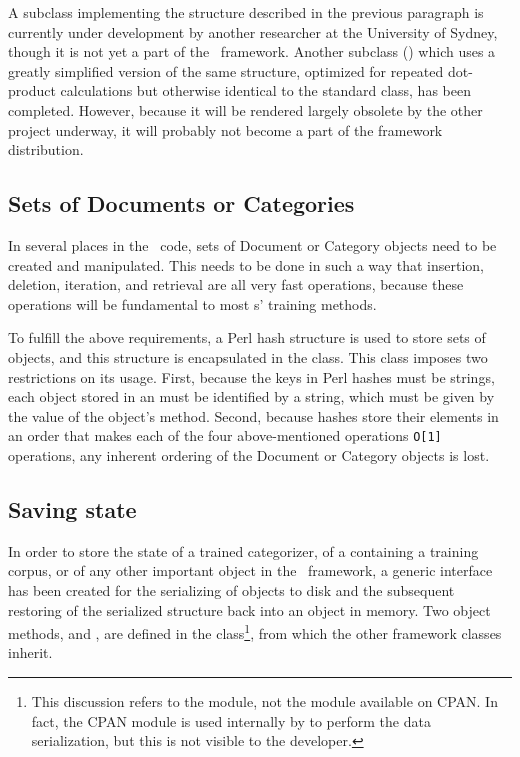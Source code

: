 A  subclass implementing the structure described
in the previous paragraph is currently under development by another
researcher at the University of Sydney, though it is not yet a part of
the \aicat\ framework.  Another  subclass
() which uses a greatly simplified
version of the same structure, optimized for repeated dot-product
calculations but otherwise identical to the standard
 class, has been completed.  However, because it
will be rendered largely obsolete by the other project underway, it
will probably not become a part of the framework distribution.

\subsection{Sets of Documents or Categories}

In several places in the \aicat\ code, sets of Document or Category
objects need to be created and manipulated.  This needs to be done in
such a way that insertion, deletion, iteration, and retrieval are all
very fast operations, because these operations will be fundamental to
most s' training methods.

To fulfill the above requirements, a Perl hash structure is used to
store sets of objects, and this structure is encapsulated in the
 class.  This class imposes two restrictions on its
usage.  First, because the keys in Perl hashes must be strings, each
object stored in an  must be identified by a string,
which must be given by the value of the object's 
method.  Second, because hashes store their elements in an order that
makes each of the four above-mentioned operations \texttt{O[1]}
operations, any inherent ordering of the Document or Category objects
is lost.

\subsection{Saving state}
\label{saving-state}

In order to store the state of a trained categorizer, of a
 containing a training corpus, or of any other
important object in the \aicat\ framework, a generic interface has
been created for the serializing of objects to disk and the subsequent
restoring of the serialized structure back into an object in memory.
Two object methods,  and ,
are defined in the  class\footnote{This discussion
  refers to the  module, not the
   module available on CPAN.  In fact, the
   CPAN module is used internally by
   to perform the data serialization,
  but this is not visible to the developer.}, from which the other
framework classes inherit.

